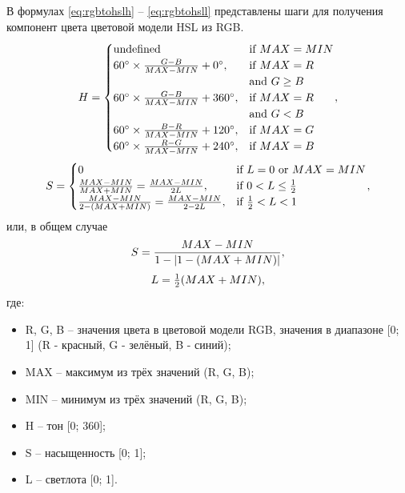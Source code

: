 В формулах \ref{eq:rgbtohslh} -- \ref{eq:rgbtohsll} представлены шаги для получения компонент цвета цветовой модели HSL из RGB.
\begin{equation}
	{\label{eq:rgbtohslh}\displaystyle H={\begin{cases}{\mbox{undefined}}&{\mbox{if }}MAX=MIN\\60^{\circ }\times {\frac {G-B}{MAX-MIN}}+0^{\circ },&{\mbox{if }}MAX=R\\&{\mbox{and }}G\geq B\\60^{\circ }\times {\frac {G-B}{MAX-MIN}}+360^{\circ },&{\mbox{if }}MAX=R\\&{\mbox{and }}G<B\\60^{\circ }\times {\frac {B-R}{MAX-MIN}}+120^{\circ },&{\mbox{if }}MAX=G\\60^{\circ }\times {\frac {R-G}{MAX-MIN}}+240^{\circ },&{\mbox{if }}MAX=B\end{cases}},}
\end{equation}
\begin{equation}
	{\label{eq:rgbtohsls0}\displaystyle S={\begin{cases}0&{\mbox{if }}L=0{\mbox{ or }}MAX=MIN\\{\frac {MAX-MIN}{MAX+MIN}}={\frac {MAX-MIN}{2L}},&{\mbox{if }}0<L\leq {\frac {1}{2}}\\{\frac {MAX-MIN}{2-(MAX+MIN)}}={\frac {MAX-MIN}{2-2L}},&{\mbox{if }}{\frac {1}{2}}<L<1\\\end{cases}},}
\end{equation} или, в общем случае
\begin{equation}
	{\label{eq:rgbtohsls1}\displaystyle S={\frac {MAX-MIN}{1-|1-(MAX+MIN)|}},}
\end{equation}
\begin{equation}
	{\label{eq:rgbtohsll}\displaystyle L={\begin{matrix}{\frac {1}{2}}\end{matrix}}(MAX+MIN),}
\end{equation} где:
\begin{itemize}
	\item R, G, B -- значения цвета в цветовой модели RGB, значения в диапазоне [0; 1] (R - красный, G - зелёный, B - синий);
	\item MAX -- максимум из трёх значений (R, G, B);
	\item MIN -- минимум из трёх значений (R, G, B);
	\item H -- тон [0; 360];
	\item S -- насыщенность [0; 1];
	\item L -- светлота [0; 1].
\end{itemize}

